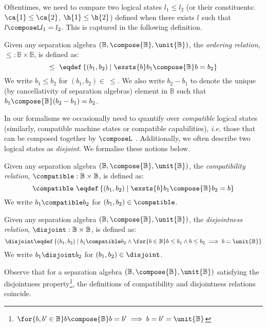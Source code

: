 %
%
Oftentimes, we need to compare two logical states $l_1 \leq l_2$ (or their constituents: $\ca{1} \leq \ca{2}$, $\h{1} \leq \h{2}$) defined when there exists $l$ such that $l\composeL l_1 = l_2$. This is captured in the following definition.
%
%
\begin{definition}[Ordering]
Given any separation algebra $(\mathbb{B}, \compose{\mathbb{B}}, \unit{\mathbb{B}})$, the \emph{ordering relation}, $\leq : \mathbb{B} \times \mathbb{B}$, is defined as:
%
\[
	\leq\ \eqdef \left\{(b_1, b_2) \mid \exsts{b} b_1 \compose{\mathbb{B}} b = b_2 \right\}
\]
%
We write $b_1 \leq b_2$ for $(b_1, b_2) \in\ \leq$. We also write $b_2 - b_1$ to denote the unique (by cancellativity of separation algebras) element in $\mathbb{B}$ such that $b_1 \compose{\mathbb{B}} (b_2 - b_1) = b_2$.
%
\end{definition}
%
%
In our formalisms we occasionally need to quantify over \emph{compatible} logical states (similarly, compatible machine states or compatible capabilities), \textit{i.e.} those that can be composed together by $\composeL$ . Additionally, we often describe two logical states as \emph{disjoint}. We formalise these notions below. 
%
%
\begin{definition}[Compatibility]
Given any separation algebra $(\mathbb{B}, \compose{\mathbb{B}}, \unit{\mathbb{B}})$, the \emph{compatibility relation}, $\compatible : \mathbb{B} \times \mathbb{B}$, is defined as:
%
\[
	\compatible\ \eqdef \left\{(b_1, b_2) \mid \exsts{b} b_1 \compose{\mathbb{B}} b_2 = b \right\}
\]
%
We write $b_1 \compatible b_2$ for $(b_1, b_2) \in \compatible$.
\end{definition}
%
%
\begin{definition}[Disjointness]
Given any separation algebra $(\mathbb{B}, \compose{\mathbb{B}}, \unit{\mathbb{B}})$, the \emph{disjointness relation}, $\disjoint : \mathbb{B} \times \mathbb{B}$, is defined as:
%
\[
	\disjoint \eqdef \left\{(b_1, b_2) \mid b_1 \compatible b_2 \land \for{b \in \mathbb{B}} b \leq b_1 \land b \leq b_2 \implies b = \unit{\mathbb{B}} \right\}
\]
%
We write $b_1 \disjoint b_2$ for $(b_1, b_2) \in \disjoint$.
\end{definition}
%
%
Observe that for a separation algebra $(\mathbb{B}, \compose{\mathbb{B}}, \unit{\mathbb{B}})$ satisfying the disjointness property\footnote{$\for{b, b' \in \mathbb{B}} b \compose{\mathbb{B}} b = b' \implies b = b' = \unit{\mathbb{B}}$}, the definitions of compatibility and disjointness relations coincide. \\

